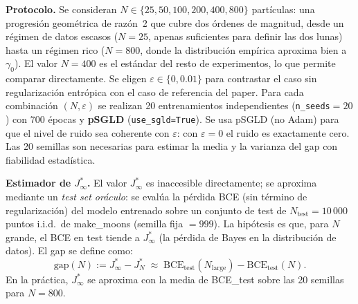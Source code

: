 \documentclass[11pt, a4paper]{article}
\theoremstyle{definition}
\begin{document}
\textbf{Protocolo.} Se consideran $N \in \{25, 50, 100, 200, 400, 800\}$
partículas: una progresión geométrica de razón~2 que cubre dos órdenes de
magnitud, desde un régimen de datos escasos ($N=25$, apenas suficientes
para definir las dos lunas) hasta un régimen rico ($N=800$, donde la
distribución empírica aproxima bien a $\gamma_0$). El valor $N=400$ es el
estándar del resto de experimentos, lo que permite comparar directamente.
Se eligen $\varepsilon \in \{0, 0.01\}$ para contrastar el caso sin
regularización entrópica con el caso de referencia del paper.
Para cada combinación $(N, \varepsilon)$ se realizan 20 entrenamientos
independientes (\texttt{n\_seeds}$=20$) con 700 épocas y \textbf{pSGLD}
(\texttt{use\_sgld=True}). Se usa pSGLD (no Adam) para que el nivel de
ruido sea coherente con $\varepsilon$: con $\varepsilon=0$ el ruido es
exactamente cero. Las 20 semillas son necesarias para estimar la media
y la varianza del gap con fiabilidad estadística.

\textbf{Estimador de $J^*_\infty$.} El valor $J^*_\infty$ es inaccesible
directamente; se aproxima mediante un \emph{test set oráculo}: se evalúa la
pérdida BCE (sin término de regularización) del modelo entrenado sobre un
conjunto de test de $N_\text{test} = 10\,000$ puntos i.i.d.\ de make\_moons (semilla fija $= 999$).
La hipótesis es que, para $N$ grande, el BCE en test tiende a $J^*_\infty$
(la pérdida de Bayes en la distribución de datos). El gap se define como:
\begin{equation}
  \text{gap}(N) := J^*_\infty - J^*_N \;\approx\;
  \text{BCE}_\text{test}(N_\text{large}) - \text{BCE}_\text{test}(N).
\end{equation}
En la práctica, $J^*_\infty$ se aproxima con la media de BCE\_test sobre las
20 semillas para $N=800$.
\end{document}
